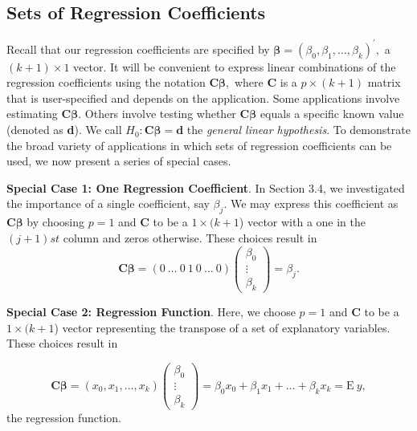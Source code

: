 \subsection{Sets of Regression Coefficients}\label{S4:SetsRegCoeff}

Recall that our regression coefficients are specified by
$\boldsymbol \beta =\left( \beta_0, \beta_1, \ldots,\beta_k \right)
^{\prime},$ a $(k+1)\times 1$ vector. It will be convenient to
express linear combinations of the regression coefficients using the
notation $\mathbf{C} \boldsymbol \beta,$ where \textbf{C} is a
$p\times (k+1)$ matrix that is user-specified  and depends on the
application. Some applications involve estimating $\mathbf{C}
\boldsymbol \beta$. Others involve testing whether $\mathbf{C}
\boldsymbol \beta$ equals a specific known value (denoted as
\textbf{d}). We call $H_0:\mathbf{C \boldsymbol \beta =d}$ the
\emph{general linear hypothesis}. To demonstrate the broad variety
of applications in which sets of regression coefficients can be
used, we now present a series of special cases.


\textbf{Special Case 1: One Regression Coefficient}. In Section 3.4,
we investigated the importance of a single coefficient, say
$\beta_j.$ We may express this coefficient as $\mathbf{C}
\boldsymbol \beta$ by choosing $p=1$ and \textbf{C} to be a $1\times
(k+1$) vector with a one in the $(j+1)st$ column and zeros
otherwise. These choices result in
\begin{equation*}
\mathbf{C \boldsymbol \beta =}\left( 0~\ldots~0~1~0~\ldots~0\right)
\left(
\begin{array}{c}
\beta_0 \\
\vdots  \\
\beta_k%
\end{array}
\right) =\beta_j.
\end{equation*}

\textbf{Special Case 2: Regression Function}. Here, we choose $p=1$
and \textbf{C} to be a $1\times (k+1$) vector representing the
transpose of a set of explanatory variables. These choices result in

\begin{equation*}
\mathbf{C \boldsymbol \beta =}\left(x_0,x_1, \ldots, x_k \right)
\left(
\begin{array}{c}
\beta_0 \\
\vdots  \\
\beta_k
\end{array}
\right) = \beta_0 x_0 + \beta_1 x_1 +\ldots + \beta_k x_k =
\mathrm{E} ~y,
\end{equation*}
the regression function.

